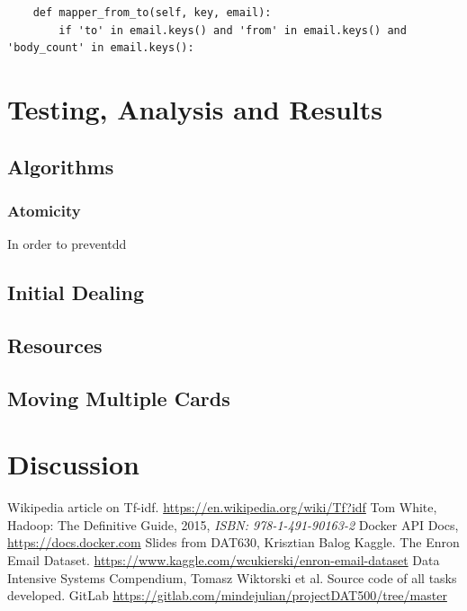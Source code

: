 \documentclass[runningheads,a4paper]{llncs}
\begin{document}
\begin{verbatim}
    def mapper_from_to(self, key, email):
        if 'to' in email.keys() and 'from' in email.keys() and 'body_count' in email.keys():
\end{verbatim}

\section{Testing, Analysis and Results}
\label{sec:3_implementation}
\subsection{Algorithms}
\subsubsection{Atomicity}
In order to preventdd
\subsection{Initial Dealing}
\subsection{Resources}
\subsection{Moving Multiple Cards}

\section{Discussion}



\begin{thebibliography}{7}

 Wikipedia article on Tf-idf. \url{https://en.wikipedia.org/wiki/Tf?idf}
 Tom White, Hadoop: The Definitive Guide, 2015, \emph{ISBN: 978-1-491-90163-2}
 Docker API Docs, \url{https://docs.docker.com}
 Slides from DAT630, Krisztian Balog
 Kaggle. The Enron Email Dataset. \url{https://www.kaggle.com/wcukierski/enron-email-dataset}
 Data Intensive Systems Compendium, Tomasz Wiktorski et al.
 Source code of all tasks developed. GitLab \url{https://gitlab.com/mindejulian/projectDAT500/tree/master}

\end{thebibliography}
\end{document}
